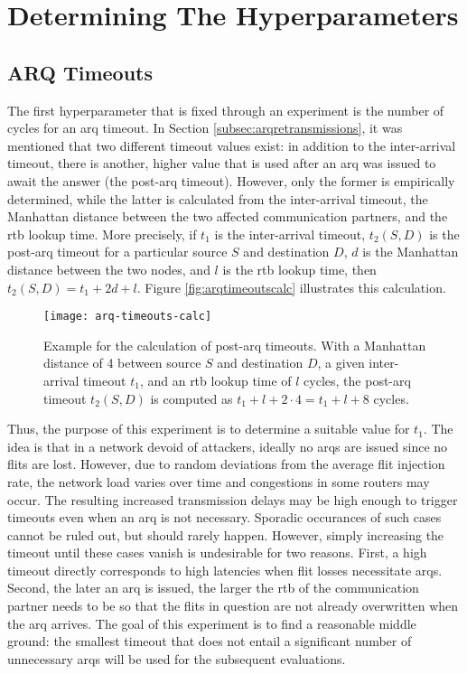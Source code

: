 \section{Determining The Hyperparameters}\label{sec:hyperparamseval}
\subsection{ARQ Timeouts}\label{subsec:arqtimeouts}
The first hyperparameter that is fixed through an experiment is the number of cycles for an \gls{arq} timeout. In Section
\ref{subsec:arqretransmissions}, it was mentioned that two different timeout values exist: in addition to the inter-arrival timeout, there is another,
higher value that is used after an \gls{arq} was issued to await the answer (the post-\gls{arq} timeout). However, only the former
is empirically determined, while the latter is calculated from the inter-arrival timeout, the Manhattan distance between the
two affected communication partners, and the \gls{rtb} lookup time. More precisely, if $t_1$ is the inter-arrival timeout, $t_2(S, D)$ is the post-\gls{arq} timeout for a
particular source $S$ and destination $D$, $d$ is the Manhattan distance between the two nodes, and $l$ is the \gls{rtb} lookup time, then $t_2(S, D)
= t_1 + 2d + l$. Figure \vref{fig:arqtimeoutscalc} illustrates this calculation. 

\begin{figure}
    \centering
    \texttt{[image: arq-timeouts-calc]}
    \caption[Example of the post-ARQ timeout calculation]{Example for the calculation of post-\gls{arq} timeouts. With a Manhattan distance of 4
    between source $S$ and destination $D$, a given inter-arrival timeout $t_1$, and an \gls{rtb} lookup time of $l$ cycles, the post-\gls{arq}
    timeout $t_2(S, D)$ is computed as $t_1 + l + 2 \cdot 4 = t_1 + l + 8$ cycles.}
    \label{fig:arqtimeoutscalc}
\end{figure}

Thus, the purpose of this experiment is to determine a suitable value for $t_1$. The idea is that in a network devoid of attackers, ideally no
\glspl{arq} are issued since no flits are lost. However, due to random deviations from the average flit injection rate, the network load varies over
time and congestions in some routers
may occur. The resulting increased transmission delays may be high enough to trigger timeouts even when an \gls{arq} is not necessary. Sporadic
occurances of such cases cannot be ruled out, but should rarely happen. However, simply increasing the timeout until these cases vanish is undesirable
for two reasons. First, a high timeout directly corresponds to high latencies when flit losses necessitate \glspl{arq}. Second, the later an \gls{arq}
is issued, the larger the \gls{rtb} of the communication partner needs to be so that the flits in question are not already overwritten when the
\gls{arq} arrives. The goal of this experiment is to find a reasonable middle ground: the smallest timeout that does not entail a significant number of
unnecessary \glspl{arq} will be used for the subsequent evaluations.

